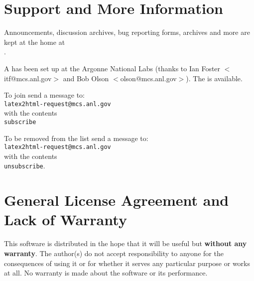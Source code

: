 \section{Support and More Information}

Announcements, discussion archives, bug reporting forms, archives and
more are kept at the \latextohtml home at \\
.

A  has been set up at the
Argonne National Labs (thanks to Ian Foster 
$<$itf@mcs.anl.gov$>$ and Bob Olson $<$olson@mcs.anl.gov$>$). The
 is
available.

To join send a message to: \\
{\tt latex2html-request@mcs.anl.gov}  \\
with the contents \\
{\tt subscribe}

To be removed from the list send a message to: \\
{\tt latex2html-request@mcs.anl.gov}  \\
with the contents \\
{\tt unsubscribe}.

\section{General License Agreement and Lack of Warranty}
This software is distributed in the hope that it will be useful
but {\bf without any warranty}. The author(s) do not accept responsibility 
to anyone for the consequences of using it or for whether it serves 
any particular purpose or works at all. No warranty is made about 
the software or its performance. 
 
